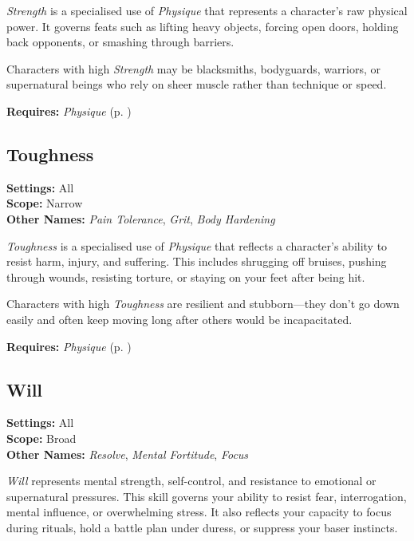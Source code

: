 \emph{Strength} is a specialised use of \emph{Physique} that represents a character’s raw physical power. It governs feats such as lifting heavy objects, forcing open doors, holding back opponents, or smashing through barriers.

Characters with high \emph{Strength} may be blacksmiths, bodyguards, warriors, or supernatural beings who rely on sheer muscle rather than technique or speed.

\vspace{0.5\baselineskip}
\noindent\textbf{Requires:} \emph{Physique} (p. \pageref{skill:physique})


\subsection{Toughness}\label{skill:toughness}
\textbf{Settings:} All\\
\textbf{Scope:} Narrow\\
\textbf{Other Names:} \emph{Pain Tolerance}, \emph{Grit}, \emph{Body Hardening}\\
\vspace{\baselineskip}

\emph{Toughness} is a specialised use of \emph{Physique} that reflects a character’s ability to resist harm, injury, and suffering. This includes shrugging off bruises, pushing through wounds, resisting torture, or staying on your feet after being hit.

Characters with high \emph{Toughness} are resilient and stubborn—they don’t go down easily and often keep moving long after others would be incapacitated.

\vspace{0.5\baselineskip}
\noindent\textbf{Requires:} \emph{Physique} (p. \pageref{skill:physique})


\subsection{Will}\label{skill:will}
\textbf{Settings:} All\\
\textbf{Scope:} Broad\\
\textbf{Other Names:} \emph{Resolve}, \emph{Mental Fortitude}, \emph{Focus}\\
\vspace{\baselineskip}

\emph{Will} represents mental strength, self-control, and resistance to emotional or supernatural pressures. This skill governs your ability to resist fear, interrogation, mental influence, or overwhelming stress. It also reflects your capacity to focus during rituals, hold a battle plan under duress, or suppress your baser instincts.

